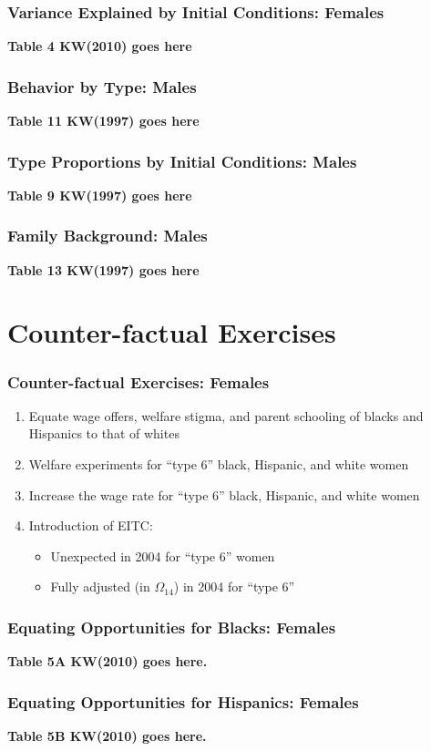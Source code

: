 \begin{frame}
	\frametitle{Variance Explained by Initial Conditions: Females}
	\textbf{Table 4 KW(2010) goes here}	
\end{frame}

\begin{frame}
	\frametitle{Behavior by Type: Males}
	\textbf{Table 11 KW(1997) goes here}	
\end{frame}

\begin{frame}
	\frametitle{Type Proportions by Initial Conditions: Males}
	\textbf{Table 9 KW(1997) goes here}	
\end{frame}

\begin{frame}
	\frametitle{Family Background: Males}
	\textbf{Table 13 KW(1997) goes here}	
\end{frame}

\section{Counter-factual Exercises}

\begin{frame}
	\frametitle{Counter-factual Exercises: Females}
		\begin{enumerate}
			\item Equate wage offers, welfare stigma, and parent schooling of blacks and Hispanics to that of whites 
			\item Welfare experiments for ``type 6'' black, Hispanic, and white women 
			\item Increase the wage rate for ``type 6'' black, Hispanic, and white women
			\item Introduction of EITC:
				\begin{itemize}
					\item Unexpected in 2004 for ``type 6'' women
					\item Fully adjusted (in $\Omega_{14}$) in 2004 for ``type 6''
				\end{itemize}							
		\end{enumerate}
\end{frame}

\begin{frame}
	\frametitle{Equating Opportunities for Blacks: Females}
		\textbf{Table 5A KW(2010) goes here.}
\end{frame}

\begin{frame}
	\frametitle{Equating Opportunities for Hispanics: Females}
		\textbf{Table 5B KW(2010) goes here.}
\end{frame}

